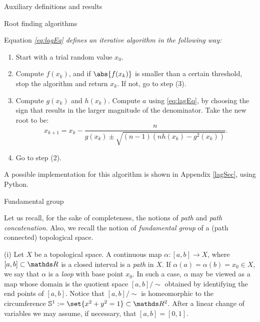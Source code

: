\documentclass[11pt, a4paper, english, twoside, notitlepage, openright]{report}
\begin{document}
\begin{chapter}{Auxiliary definitions and results}
\begin{section}{Root finding algorithms}
\begin{proposition}
Equation \em \ref{eq:lagEq} \em defines an iterative algorithm in the following way:
\em
\begin{enumerate}[(1)]
\item Start with a trial random value $x_0$.
\item Compute $f(x_k)$, and if $\abs{f(x_k)}$ is smaller than a certain threshold, stop the algorithm and return $x_k$. If not, go to step (3).
\item Compute $g(x_k)$ and $h(x_k)$. Compute $a$ using \ref{eq:lagEq}, by choosing the sign that results in the larger magnitude of the denominator. Take the new root to be:
$$
x_{k+1}=x_k-\frac{n}{g(x_k)\pm\sqrt{ (n-1)(nh(x_k)-g^2(x_k))}}.
$$ 
\item Go to step (2).
\end{enumerate}
\em
\end{proposition}
\end{section}
A possible implementation for this algorithm is shown in Appendix \ref{lagSec}, using Python.

\begin{section}{Fundamental group}\label{fundgroup} 

Let us recall, for the sake of completeness, the notions of \emph{path} and \emph{path concatenation}. Also, we recall the notion of \emph{fundamental group} of a (path connected) topological space.

\vspace{1mm}

\begin{definitions}\label{pathDefs}
(i) Let $X$ be a topological space. A continuous map $\alpha:[a,b]\to X$, where $[a,b]\subset\R$ is a closed interval is a \emph{path} in $X$. If $\alpha(a)=\alpha(b)=x_0\in X$, we say that $\alpha$ is a \emph{loop} with base point $x_0$. In such a case, $\alpha$ may be viewed as a map whose domain is the quotient space $[a,b]/\!\sim$ obtained by identifying the end points of $[a,b]$. Notice that $[a,b]/\!\sim$ is homeomorphic to the circumference $\mathbb{S}^1:=\set{x^2+y^2=1}\subset\R^2$. After a linear change of variables we may assume, if necessary, that $[a,b]=[0,1]$.

\vspace{1mm}


\end{definitions}
\end{section}
\end{chapter}
\end{document}
